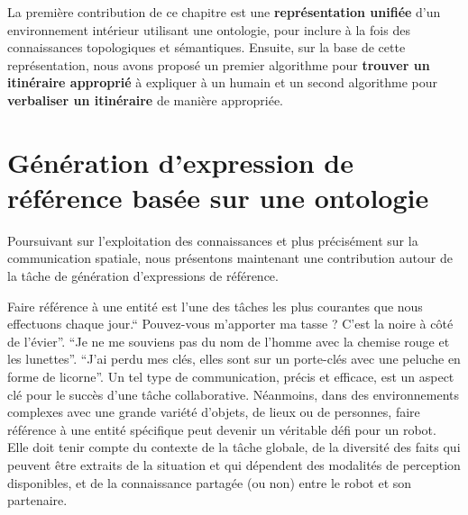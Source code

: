 La première contribution de ce chapitre est une \textbf{représentation unifiée} d'un environnement intérieur utilisant une ontologie, pour inclure à la fois des connaissances topologiques et sémantiques. Ensuite, sur la base de cette représentation, nous avons proposé un premier algorithme pour \textbf{trouver un itinéraire approprié} à expliquer à un humain et un second algorithme pour \textbf{verbaliser un itinéraire} de manière appropriée. 

\section*{Génération d'expression de référence basée sur une ontologie}

Poursuivant sur l'exploitation des connaissances et plus précisément sur la communication spatiale, nous présentons maintenant une contribution autour de la tâche de génération d'expressions de référence.

Faire référence à une entité est l'une des tâches les plus courantes que nous effectuons chaque jour.`` Pouvez-vous m'apporter ma tasse ? C'est la noire à côté de l'évier''. ``Je ne me souviens pas du nom de l'homme avec la chemise rouge et les lunettes''. ``J'ai perdu mes clés, elles sont sur un porte-clés avec une peluche en forme de licorne''. Un tel type de communication, précis et efficace, est un aspect clé pour le succès d'une tâche collaborative. Néanmoins, dans des environnements complexes avec une grande variété d'objets, de lieux ou de personnes, faire référence à une entité spécifique peut devenir un véritable défi pour un robot. Elle doit tenir compte du contexte de la tâche globale, de la diversité des faits qui peuvent être extraits de la situation et qui dépendent des modalités de perception disponibles, et de la connaissance partagée (ou non) entre le robot et son partenaire. 

